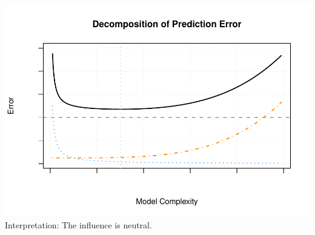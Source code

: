 \documentclass[]{report}
\begin{document}
\includegraphics{MyBook_files/figure-latex/unnamed-chunk-97-1.pdf}
Interpretation: The influence is neutral.
\end{document}

